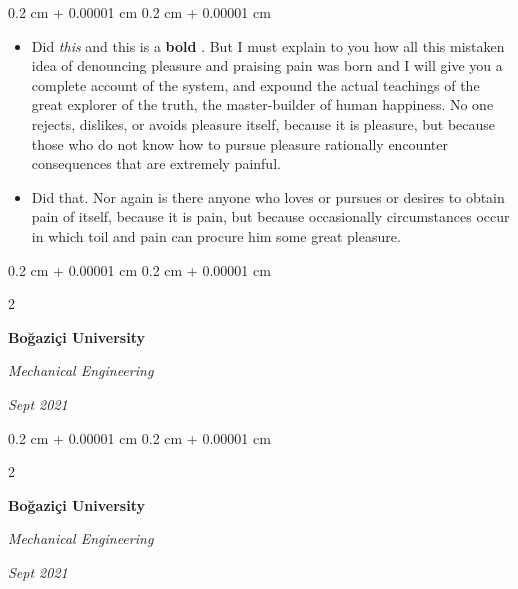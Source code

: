 \documentclass[10pt, letterpaper]{article}
\newenvironment{highlights}{
    \begin{itemize}[
        topsep=0.10 cm,
        parsep=0.10 cm,
        partopsep=0pt,
        itemsep=0pt,
        leftmargin=0.4 cm + 10pt
    ]
}{
    \end{itemize}
} %
\newenvironment{onecolentry}{
    \begin{adjustwidth}{
        0.2 cm + 0.00001 cm
    }{
        0.2 cm + 0.00001 cm
    }
}{
    \end{adjustwidth}
} %
\newenvironment{twocolentry}[2][]{
    \onecolentry
    \def\secondColumn{#2}
    \setcolumnwidth{\fill, 4.5 cm}
    \begin{paracol}{2}
}{
    \switchcolumn \raggedleft \secondColumn
    \end{paracol}
    \endonecolentry
} %
\let\hrefWithoutArrow\href
\renewcommand{\href}[2]{\hrefWithoutArrow{#1}{\ifthenelse{\equal{#2}{}}{ }{#2 }\raisebox{.15ex}{\footnotesize \faExternalLink*}}}
\begin{document}
        \vspace{0.10 cm}
        \begin{onecolentry}
            \begin{highlights}
                \item Did \textit{this} and this is a \textbf{bold} \href{https://example.com}{link}. But I must explain to you how all this mistaken idea of denouncing pleasure and praising pain was born and I will give you a complete account of the system, and expound the actual teachings of the great explorer of the truth, the master-builder of human happiness. No one rejects, dislikes, or avoids pleasure itself, because it is pleasure, but because those who do not know how to pursue pleasure rationally encounter consequences that are extremely painful.
                \item Did that. Nor again is there anyone who loves or pursues or desires to obtain pain of itself, because it is pain, but because occasionally circumstances occur in which toil and pain can procure him some great pleasure.
            \end{highlights}
        \end{onecolentry}


        \vspace{0.2 cm}

        \begin{twocolentry}{
            
            
        \textit{Sept 2021}}
            \textbf{Boğaziçi University}

            \textit{Mechanical Engineering}
        \end{twocolentry}



        \vspace{0.2 cm}

        \begin{twocolentry}{
            
            
        \textit{Sept 2021}}
            \textbf{Boğaziçi University}

            \textit{Mechanical Engineering}
        \end{twocolentry}
\end{document}
